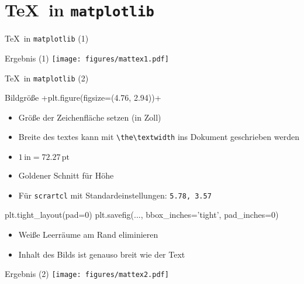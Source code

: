 \section{\TeX\ in \texttt{matplotlib}}

\begin{frame}[fragile]{\TeX\ in \texttt{matplotlib} (1)}
\end{frame}

\AddToShipoutPictureFG*{\ShowFramePicture}
\begin{frame}{Ergebnis (1)}
  \centering
  \texttt{[image: figures/mattex1.pdf]}
\end{frame}

\begin{frame}[fragile]{\TeX\ in \texttt{matplotlib} (2)}
\end{frame}

\begin{frame}[fragile]{Bildgröße}
  \lstpythoninline+plt.figure(figsize=(4.76, 2.94))+
  \begin{itemize}
    \item Größe der Zeichenfläche setzen (in Zoll)
    \item Breite des textes kann mit \lstinline+\the\textwidth+ ins Dokument geschrieben werden
    \item $1\,\mathrm{in} = \num{72.27}\,\mathrm{pt}$
    \item Goldener Schnitt für Höhe
    \item Für \texttt{scrartcl} mit Standardeinstellungen: \texttt{5.78, 3.57}
  \end{itemize}

  \begin{lstpython}
    plt.tight_layout(pad=0)
    plt.savefig(..., bbox_inches='tight', pad_inches=0)
  \end{lstpython}
  \begin{itemize}
    \item Weiße Leerräume am Rand eliminieren
    \item Inhalt des Bilds ist genauso breit wie der Text
  \end{itemize}
\end{frame}

\AddToShipoutPictureFG*{\ShowFramePicture}
\begin{frame}{Ergebnis (2)}
  \centering
  \texttt{[image: figures/mattex2.pdf]}
\end{frame}

